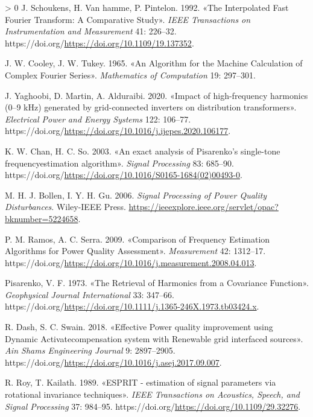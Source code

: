 \documentclass[
  italian,
]{article}
\newlength{\cslhangindent}
\newenvironment{CSLReferences}[3] %
 {%
  \setlength{\parindent}{0pt}
  \ifodd #1 \everypar{\setlength{\hangindent}{\cslhangindent}}\ignorespaces\fi
  \ifnum #2 > 0
  \setlength{\parskip}{#3\baselineskip}
  \fi
 }%
 {}
\begin{document}
\begin{CSLReferences}{1}{0}
\leavevmode\hypertarget{ref-ifft-comp}{}%
J. Schoukens, H. Van hamme, P. Pintelon. 1992. {«The Interpolated Fast
Fourier Transform: A Comparative Study»}. \emph{{IEEE} Transactions on
Instrumentation and Measurement} 41: 226--32.
https://doi.org/\url{https://doi.org/10.1109/19.137352}.

\leavevmode\hypertarget{ref-fourier-alg-machine}{}%
J. W. Cooley, J. W. Tukey. 1965. {«An Algorithm for the Machine
Calculation of Complex Fourier Series»}. \emph{Mathematics of
Computation} 19: 297--301.

\leavevmode\hypertarget{ref-impact-inverters}{}%
J. Yaghoobi, D. Martin, A. Alduraibi. 2020. {«Impact of high-frequency
harmonics (0--9 kHz) generated by grid-connected inverters on
distribution transformers»}. \emph{Electrical Power and Energy Systems}
122: 106--77.
https://doi.org/\url{https://doi.org/10.1016/j.ijepes.2020.106177}.

\leavevmode\hypertarget{ref-pisarenko-single-tone}{}%
K. W. Chan, H. C. So. 2003. {«An exact analysis of Pisarenko's
single-tone frequencyestimation algorithm»}. \emph{Signal Processing}
83: 685--90.
https://doi.org/\url{https://doi.org/10.1016/S0165-1684(02)00493-0}.

\leavevmode\hypertarget{ref-dsp-pqd}{}%
M. H. J. Bollen, I. Y. H. Gu. 2006. \emph{Signal Processing of Power
Quality Disturbances}. Wiley-{IEEE} Press.
\url{https://ieeexplore.ieee.org/servlet/opac?bknumber=5224658}.

\leavevmode\hypertarget{ref-alg-comp-quality}{}%
P. M. Ramos, A. C. Serra. 2009. {«Comparison of Frequency Estimation
Algorithms for Power Quality Assessment»}. \emph{Measurement} 42:
1312--17.
https://doi.org/\url{https://doi.org/10.1016/j.measurement.2008.04.013}.

\leavevmode\hypertarget{ref-pisarenko-original}{}%
Pisarenko, V. F. 1973. {«The Retrieval of Harmonics from a Covariance
Function»}. \emph{Geophysical Journal International} 33: 347--66.
https://doi.org/\url{https://doi.org/10.1111/j.1365-246X.1973.tb03424.x}.

\leavevmode\hypertarget{ref-effective-power-quality}{}%
R. Dash, S. C. Swain. 2018. {«Effective Power quality improvement using
Dynamic Activatecompensation system with Renewable grid interfaced
sources»}. \emph{Ain Shams Engineering Journal} 9: 2897--2905.
https://doi.org/\url{https://doi.org/10.1016/j.asej.2017.09.007}.

\leavevmode\hypertarget{ref-esprit-original}{}%
R. Roy, T. Kailath. 1989. {«{ESPRIT} - estimation of signal parameters
via rotational invariance techniques»}. \emph{{IEEE} Transactions on
Acoustics, Speech, and Signal Processing} 37: 984--95.
https://doi.org/\url{https://doi.org/10.1109/29.32276}.


\end{CSLReferences}
\end{document}
